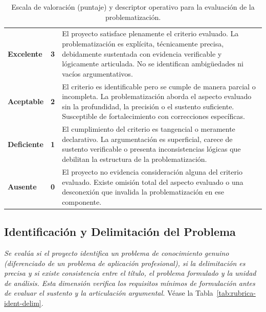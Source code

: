 \begin{table}[htbp]
\centering
\scriptsize
\caption{Escala de valoración (puntaje) y descriptor operativo para la evaluación de la problematización.}
\label{tab:escala-problematizacion}
\begin{tabularx}{\textwidth}{|C{2.8cm}|C{1cm}|X|}
\hline
{}
 &  &  \\ \hline
\textcolor{csuf}{\textbf{Excelente}} & \textbf{3} & El proyecto satisface plenamente el criterio evaluado. La problematización es explícita, técnicamente precisa, debidamente sustentada con evidencia verificable y lógicamente articulada. No se identifican ambigüedades ni vacíos argumentativos. \\ \hline
{}
\textcolor{cace}{\textbf{Aceptable}} & \textbf{2} & El criterio es identificable pero se cumple de manera parcial o incompleta. La problematización aborda el aspecto evaluado sin la profundidad, la precisión o el sustento suficiente. Susceptible de fortalecimiento con correcciones específicas. \\ \hline
\textcolor{cdef}{\textbf{Deficiente}} & \textbf{1} & El cumplimiento del criterio es tangencial o meramente declarativo. La argumentación es superficial, carece de sustento verificable o presenta inconsistencias lógicas que debilitan la estructura de la problematización. \\ \hline
{}
\textcolor{cins}{\textbf{Ausente}} & \textbf{0} & El proyecto no evidencia consideración alguna del criterio evaluado. Existe omisión total del aspecto evaluado o una desconexión que invalida la problematización en ese componente. \\ \hline
\end{tabularx}
\end{table}

\clearpage
\subsection{Identificación y Delimitación del Problema}

\textit{Se evalúa si el proyecto identifica un problema de conocimiento genuino (diferenciado de un problema de aplicación profesional), si la delimitación es precisa y si existe consistencia entre el título, el problema formulado y la unidad de análisis. Esta dimensión verifica los requisitos mínimos de formulación antes de evaluar el sustento y la articulación argumental.} Véase la Tabla~\ref{tab:rubrica-ident-delim}.


